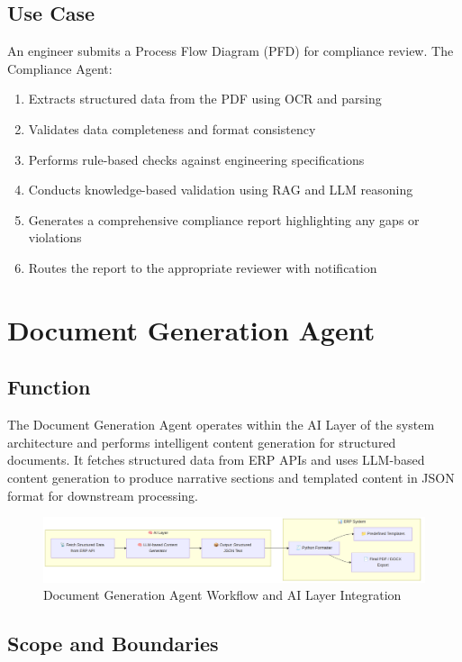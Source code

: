 \documentclass[12pt]{report}
\begin{document}
\section{Use Case}
An engineer submits a Process Flow Diagram (PFD) for compliance review. The Compliance Agent:
\begin{enumerate}
  \item Extracts structured data from the PDF using OCR and parsing
  \item Validates data completeness and format consistency
  \item Performs rule-based checks against engineering specifications
  \item Conducts knowledge-based validation using RAG and LLM reasoning
  \item Generates a comprehensive compliance report highlighting any gaps or violations
  \item Routes the report to the appropriate reviewer with notification
\end{enumerate}

\chapter{Document Generation Agent}
\section{Function}
The Document Generation Agent operates within the AI Layer of the system architecture and performs intelligent content generation for structured documents. It fetches structured data from ERP APIs and uses LLM-based content generation to produce narrative sections and templated content in JSON format for downstream processing.

\begin{figure}[htbp]
\centering
\includegraphics[width=\textwidth,height=0.8\textheight,keepaspectratio]{../../pics/doc-generation.png}
\caption{Document Generation Agent Workflow and AI Layer Integration}
\label{fig:doc-generation-workflow}
\end{figure}

\section{Scope and Boundaries}
\end{document}
